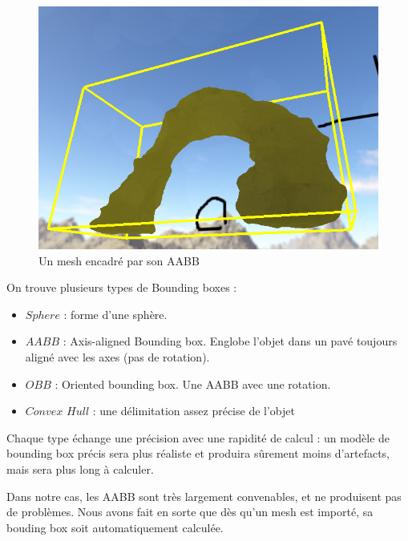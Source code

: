 \documentclass{EPUProjetDi}
\begin{document}
\begin{figure}[h]
	\centering
	\includegraphics[scale=.5]{aabb}
	\caption{Un mesh encadré par son AABB}
	\label{fig:aabb}
\end{figure}


On trouve plusieurs types de Bounding boxes :

\begin{itemize}
    \item $Sphere$ : forme d'une sphère.
    \item $AABB$ : Axis-aligned Bounding box. Englobe l'objet dans un pavé toujours aligné avec les axes (pas de rotation).
    \item $OBB$ : Oriented bounding box. Une AABB avec une rotation.
   \item $Convex$ $Hull$ : une délimitation assez précise de l'objet
\end{itemize}

Chaque type échange une précision avec une rapidité de calcul : un modèle de bounding box précis sera plus réaliste et produira sûrement moins d'artefacts, mais sera plus long à calculer. 

Dans notre cas, les AABB sont très largement convenables, et ne produisent pas de problèmes.
Nous avons fait en sorte que dès qu'un mesh est importé, sa bouding box soit automatiquement calculée.

\paragraph{}
\\
\\
\\
\end{document}
